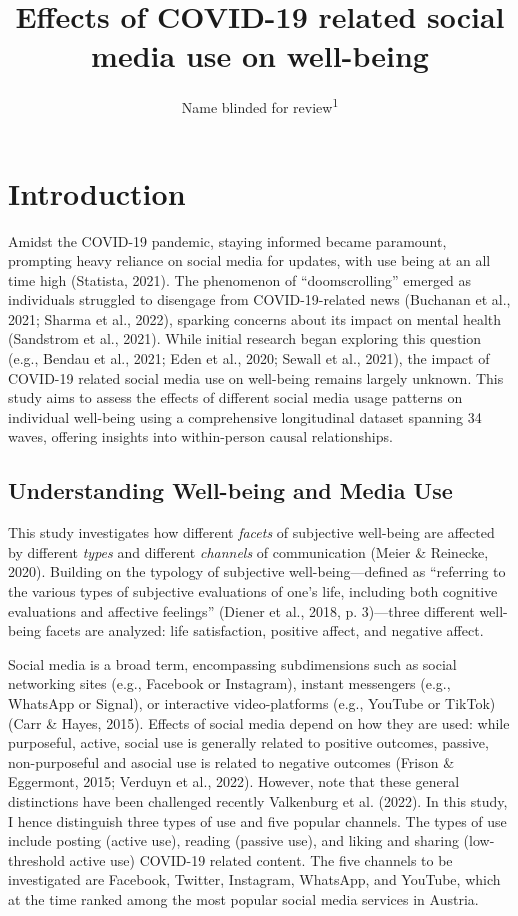 \documentclass[
  man,mask,floatsintext]{apa7}
\title{Effects of COVID-19 related social media use on well-being}
\author{Name blinded for review\textsuperscript{1}}
\date{}
\affiliation{\vspace{0.5cm}\textsuperscript{1} }
\begin{document}
\maketitle

\section{Introduction}\label{introduction}

Amidst the COVID-19 pandemic, staying informed became paramount, prompting heavy reliance on social media for updates, with use being at an all time high (Statista, 2021).
The phenomenon of ``doomscrolling'' emerged as individuals struggled to disengage from COVID-19-related news (Buchanan et al., 2021; Sharma et al., 2022), sparking concerns about its impact on mental health (Sandstrom et al., 2021).
While initial research began exploring this question (e.g., Bendau et al., 2021; Eden et al., 2020; Sewall et al., 2021), the impact of COVID-19 related social media use on well-being remains largely unknown.
This study aims to assess the effects of different social media usage patterns on individual well-being using a comprehensive longitudinal dataset spanning 34 waves, offering insights into within-person causal relationships.

\subsection{Understanding Well-being and Media Use}\label{understanding-well-being-and-media-use}

This study investigates how different \emph{facets} of subjective well-being are affected by different \emph{types} and different \emph{channels} of communication (Meier \& Reinecke, 2020).
Building on the typology of subjective well-being---defined as ``referring to the various types of subjective evaluations of one's life, including both cognitive evaluations and affective
feelings'' (Diener et al., 2018, p. 3)---three different well-being facets are analyzed: life satisfaction, positive affect, and negative affect.

Social media is a broad term, encompassing subdimensions such as social networking sites (e.g., Facebook or Instagram), instant messengers (e.g., WhatsApp or Signal), or interactive video-platforms (e.g., YouTube or TikTok) (Carr \& Hayes, 2015).
Effects of social media depend on how they are used: while purposeful, active, social use is generally related to positive outcomes, passive, non-purposeful and asocial use is related to negative outcomes (Frison \& Eggermont, 2015; Verduyn et al., 2022).
However, note that these general distinctions have been challenged recently Valkenburg et al. (2022).
In this study, I hence distinguish three types of use and five popular channels.
The types of use include posting (active use), reading (passive use), and liking and sharing (low-threshold active use) COVID-19 related content.
The five channels to be investigated are Facebook, Twitter, Instagram, WhatsApp, and YouTube, which at the time ranked among the most popular social media services in Austria.
\end{document}
